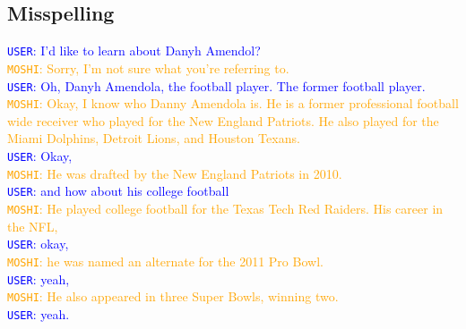 \subsection{Misspelling}
\begin{tcolorbox}
\textcolor{blue}{\texttt{USER}: I'd like to learn about Danyh Amendol?} \\
\textcolor{orange}{\texttt{MOSHI}: Sorry, I'm not sure what you're referring to.} \\
\textcolor{blue}{\texttt{USER}: Oh, Danyh Amendola, the football player. The former football player.} \\
\textcolor{orange}{\texttt{MOSHI}: Okay, I know who Danny Amendola is. He is a former professional football wide receiver who played for the New England Patriots. He also played for the Miami Dolphins, Detroit Lions, and Houston Texans.} \\
\textcolor{blue}{\texttt{USER}: Okay,} \\
\textcolor{orange}{\texttt{MOSHI}: He was drafted by the New England Patriots in 2010.} \\
\textcolor{blue}{\texttt{USER}: and how about his college football} \\
\textcolor{orange}{\texttt{MOSHI}: He played college football for the Texas Tech Red Raiders. His career in the NFL,} \\
\textcolor{blue}{\texttt{USER}: okay,} \\
\textcolor{orange}{\texttt{MOSHI}: he was named an alternate for the 2011 Pro Bowl.} \\
\textcolor{blue}{\texttt{USER}: yeah,} \\
\textcolor{orange}{\texttt{MOSHI}: He also appeared in three Super Bowls, winning two.} \\
\textcolor{blue}{\texttt{USER}: yeah.} \\
\end{tcolorbox}

